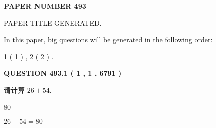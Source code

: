 \documentclass{ctexart}
\begin{document}
   
   
   
\newpage 
\setcounter{page}{ 
   493001 } 
   
   
   
   
 {\textbf{ \Large{ PAPER NUMBER  493  }}}
   
   
\vspace{0.2in}
   
   
   
   
   
   
   
   
 \vspace{0.2in}
 
 
 
 
   
   
 PAPER TITLE GENERATED.
   
   
   
\vspace{0.2in}
   
In this paper, big questions will be generated in the following order: 
   
   
   1 ( 1 )
 ,
   2 ( 2 )
 .
  
\vspace{0.2in}
  
{\textbf{\Large{QUESTION
493.1 
 ( 1 , 1 , 6791 )
}}}
  
  
 
请计算 $ %
26 +  %
54 $.
 
 
 
\noindent{}
 
 

80
 
 
\noindent{}
 
 

 
 
 
\noindent{}
 
 

$ %
26 +  %
54=   %
80$
 
 
\noindent{}
 
 

 
   
   
   
\end{document}
